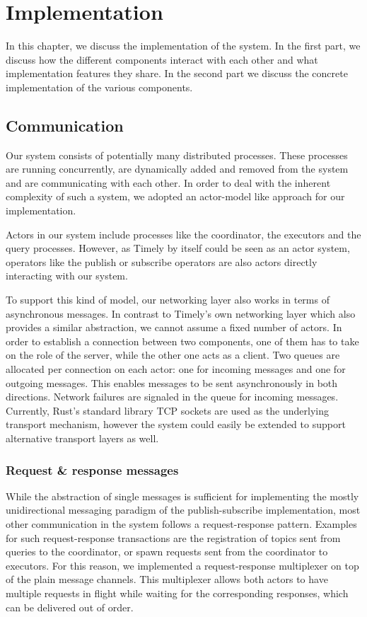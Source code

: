 \chapter{Implementation}\label{ch:impl}

In this chapter, we discuss the implementation of the system. In the first part,
we discuss how the different components interact with each other and what
implementation features they share. In the second part we discuss the concrete
implementation of the various components.

\section{Communication}

Our system consists of potentially many distributed processes. These processes
are running concurrently, are dynamically added and removed from the system
and are communicating with each other. In order to deal with the inherent
complexity of such a system, we adopted an actor-model like approach for our
implementation.

Actors in our system include processes like the coordinator, the executors 
and the query processes. However, as Timely by itself could be seen as an
actor system, operators like the publish or subscribe operators are also actors
directly interacting with our system.

To support this kind of model, our networking layer also works in terms of
asynchronous messages. In contrast to Timely's own networking layer which also
provides a similar abstraction, we cannot assume a fixed number of actors.
In order to establish a connection between two components, one of them has to
take on the role of the server, while the other one acts as a client. Two
queues are allocated per connection on each actor: one for incoming messages
and one for outgoing messages. This enables messages to be sent asynchronously
in both directions. Network failures are signaled in the queue for incoming
messages. Currently, Rust's standard library TCP sockets are used as the
underlying transport mechanism, however the system could easily be extended to
support alternative transport layers as well.

\subsection{Request \& response messages}

While the abstraction of single messages is sufficient for implementing the
mostly unidirectional messaging paradigm of the publish-subscribe implementation,
most other communication in the system follows a request-response pattern. Examples
for such request-response transactions are the registration of topics sent from
queries to the coordinator, or spawn requests sent from the coordinator to
executors. For this reason, we implemented a request-response multiplexer on
top of the plain message channels. This multiplexer allows both actors to have
multiple requests in flight while waiting for the corresponding responses,
which can be delivered out of order.

